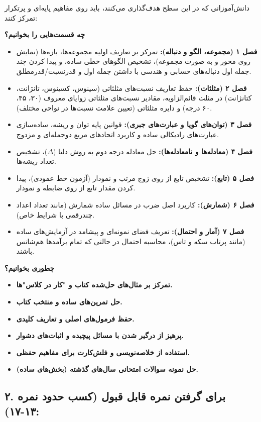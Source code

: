 \documentclass[12pt,a4paper]{article}
\begin{document}
دانش‌آموزانی که در این سطح هدف‌گذاری می‌کنند، باید روی مفاهیم پایه‌ای و پرتکرار تمرکز کنند:

\textbf{چه قسمت‌هایی را بخوانیم؟}
\begin{itemize}
    \item \textbf{فصل ۱ (مجموعه، الگو و دنباله):} تمرکز بر تعاریف اولیه مجموعه‌ها، بازه‌ها (نمایش روی محور و به صورت مجموعه)، تشخیص الگوهای خطی ساده، و پیدا کردن چند جمله اول دنباله‌های حسابی و هندسی با داشتن جمله اول و قدرنسبت/قدرمطلق.
    \item \textbf{فصل ۲ (مثلثات):} حفظ تعاریف نسبت‌های مثلثاتی (سینوس، کسینوس، تانژانت، کتانژانت) در مثلث قائم‌الزاویه، مقادیر نسبت‌های مثلثاتی زوایای معروف (۳۰، ۴۵، ۶۰ درجه) و دایره مثلثاتی (تعیین علامت نسبت‌ها در نواحی مختلف).
    \item \textbf{فصل ۳ (توان‌های گویا و عبارت‌های جبری):} قوانین پایه توان و ریشه، ساده‌سازی عبارت‌های رادیکالی ساده و کاربرد اتحادهای مربع دوجمله‌ای و مزدوج.
    \item \textbf{فصل ۴ (معادله‌ها و نامعادله‌ها):} حل معادله درجه دوم به روش دلتا ($\Delta$)، تشخیص تعداد ریشه‌ها.
    \item \textbf{فصل ۵ (تابع):} تشخیص تابع از روی زوج مرتب و نمودار (آزمون خط عمودی)، پیدا کردن مقدار تابع از روی ضابطه و نمودار.
    \item \textbf{فصل ۶ (شمارش):} کاربرد اصل ضرب در مسائل ساده شمارش (مانند تعداد اعداد چندرقمی با شرایط خاص).
    \item \textbf{فصل ۷ (آمار و احتمال):} تعریف فضای نمونه‌ای و پیشامد در آزمایش‌های ساده (مانند پرتاب سکه و تاس)، محاسبه احتمال در حالتی که تمام برآمدها هم‌شانس باشند.
\end{itemize}

\textbf{چطوری بخوانیم؟}
\begin{itemize}
    \item \textbf{تمرکز بر مثال‌های حل‌شده کتاب و "کار در کلاس"ها.}
    \item \textbf{حل تمرین‌های ساده و منتخب کتاب.}
    \item \textbf{حفظ فرمول‌های اصلی و تعاریف کلیدی.}
    \item \textbf{پرهیز از درگیر شدن با مسائل پیچیده و اثبات‌های دشوار.}
    \item \textbf{استفاده از خلاصه‌نویسی و فلش‌کارت برای مفاهیم حفظی.}
    \item \textbf{حل نمونه سوالات امتحانی سال‌های گذشته (بخش‌های ساده).}
\end{itemize}

\subsection*{۲. برای گرفتن نمره قابل قبول (کسب حدود نمره ۱۳-۱۷):}
\end{document}
